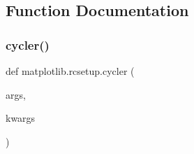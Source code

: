 \subsection{Function Documentation}
\mbox{\label{namespacematplotlib_1_1rcsetup_a29c47517d743865c566909d5807d4828}} 
\subsubsection{\texorpdfstring{cycler()}{cycler()}}
{\footnotesize\ttfamily def matplotlib.\+rcsetup.\+cycler (\begin{DoxyParamCaption}\item[{}]{args,  }\item[{}]{kwargs }\end{DoxyParamCaption})}

